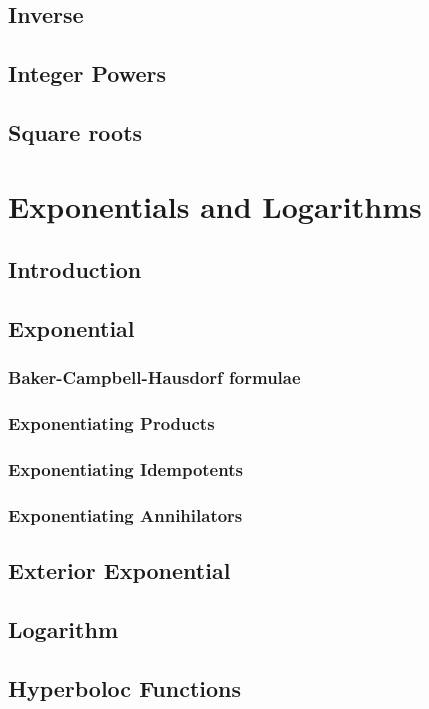 \documentclass[a4paper]{book}
\numberwithin{equation}{chapter}
\begin{document}
    \subsection{Inverse}
    \subsection{Integer Powers}
    \subsection{Square roots}
    
    \section{Exponentials and Logarithms}

    \subsection{Introduction}
    \subsection{Exponential}
    \subsubsection{Baker-Campbell-Hausdorf formulae}
    \subsubsection{Exponentiating Products}
    \subsubsection{Exponentiating Idempotents}
    \subsubsection{Exponentiating Annihilators}
    
    \subsection{Exterior Exponential}
    \subsection{Logarithm}

    \subsection{Hyperboloc Functions}
\end{document}
